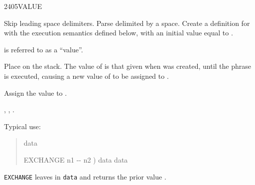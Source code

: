 \begin{worddef}{2405}{VALUE}
\item {}

	Skip leading space delimiters. Parse  delimited by
	a space. Create a definition for  with the execution
	semantics defined below, with an initial value equal to .

	 is referred to as a ``value''.

\execute[name]

	Place  on the stack. The value of  is that
	given when  was created, until the phrase 
	  is executed, causing a new value of
	 to be assigned to .


	Assign the value  to .

\see {},
	,
	.

	\begin{rationale} %
		Typical use:
		\begin{quote}  data

			\word{:} EXCHANGE  n1 -{}- n2 )
				data   data
			\word{;}
		\end{quote}
		\texttt{EXCHANGE} leaves  in \texttt{data} and
		returns the prior value .
	\end{rationale}

	\begin{testing} %
		 \\
		 \\
		 \\
		 \\
		 \\

		 \\

		 \\
		 \\
		 \\
		 \\
	\end{testing}
\end{worddef}


